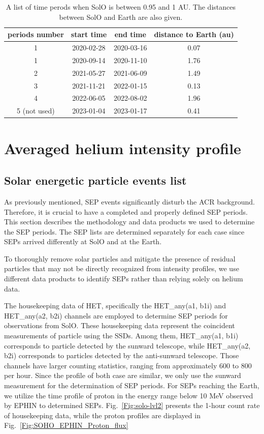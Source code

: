\begin{table}[!htb]
    \centering
	\caption[Time perods when \ac{SolO} closed to 1 au]{A list of time perods when \ac{SolO} is between 0.95 and 1 AU. The distances between \ac{SolO} and Earth are also given.}
	\label{tab:1AU_period}
    \begin{tabular}{|c|c|c|c|}
    \hline
	periods number & start time & end time & distance to Earth  (au)\\
    \hline
    1   & 2020-02-28 & 2020-03-16   & 0.07 \\
    \hline
	1	& 2020-09-14 & 2020-11-10	& 1.76 \\
    \hline
	2	& 2021-05-27 & 2021-06-09	& 1.49 \\
    \hline
	3	& 2021-11-21 & 2022-01-15	& 0.13 \\
    \hline
	4	& 2022-06-05 & 2022-08-02	& 1.96 \\
    \hline
    5 (not used)	& 2023-01-04 & 2023-01-17	& 0.41 \\
    \hline
    \end{tabular}
\end{table}

\section{Averaged helium intensity profile}
\subsection*{Solar energetic particle events list}

As previously mentioned, \ac{SEP} events significantly disturb the \ac{ACR} background. Therefore, it is crucial to have a completed and properly defined \ac{SEP} periods. This section describes the methodology and data products we used to determine the \ac{SEP} periods. The \ac{SEP} lists are determined separately for each case since \acp{SEP} arrived differently at \ac{SolO} and at the Earth. 

To thoroughly remove solar particles and mitigate the presence of residual particles that may not be directly recognized from intensity profiles, we use different data products to identify \acp{SEP} rather than relying solely on helium data.

The housekeeping data of \ac{HET}, specifically the HET\_any(a1, b1i) and HET\_any(a2, b2i) channels are employed to determine \ac{SEP} periods for observations from \ac{SolO}. 
These housekeeping data represent the coincident measurements of particle using the \acp{SSD}. Among them, HET\_any(a1, b1i) corresponds to particle detected by the sunward telescope, while HET\_any(a2, b2i) corresponds to particles detected by the anti-sunward telescope. Those channels have larger counting statistics, ranging from approximately 600 to 800 per hour. Since the profile of both case are similar, we only use the sunward measurement for the determination of \ac{SEP} periods. 
For \acp{SEP} reaching the Earth, we utilize the time profile of proton in the energy range below 10 MeV observed by \ac{EPHIN} to determined \acp{SEP}. 
Fig.~\ref{Fig:solo-lvl2} presents the 1-hour count rate of housekeeping data, while the proton profiles are displayed in Fig.~\ref{Fig:SOHO_EPHIN_Proton_flux}


